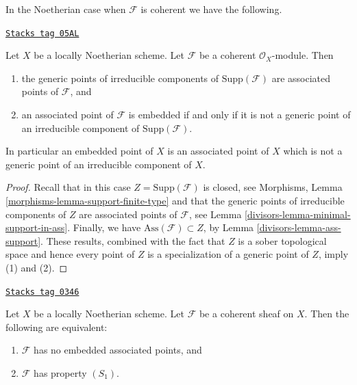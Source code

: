 In the Noetherian case when $\mathcal{F}$ is coherent we have
the following.

\begin{lemma}[Embedded]
\label{divisors-lemma-embedded}
\href{https://stacks.math.columbia.edu/tag/05AL}{\texttt{Stacks tag 05AL}}

Let $X$ be a locally Noetherian scheme.
Let $\mathcal{F}$ be a coherent $\mathcal{O}_X$-module.
Then
\begin{enumerate}
\item the generic points of irreducible components of
$\text{Supp}(\mathcal{F})$ are associated points of $\mathcal{F}$, and
\item an associated point of $\mathcal{F}$ is embedded if and only
if it is not a generic point of an irreducible component
of $\text{Supp}(\mathcal{F})$.
\end{enumerate}
In particular an embedded point of $X$ is an associated point of $X$
which is not a generic point of an irreducible component of $X$.
\end{lemma}

\begin{proof}

Recall that in this case $Z = \text{Supp}(\mathcal{F})$ is closed, see
Morphisms, Lemma \ref{morphisms-lemma-support-finite-type}
and that the generic points of irreducible components of $Z$ are
associated points of $\mathcal{F}$, see
Lemma \ref{divisors-lemma-minimal-support-in-ass}.
Finally, we have $\text{Ass}(\mathcal{F}) \subset Z$, by
Lemma \ref{divisors-lemma-ass-support}.
These results, combined with the fact that $Z$ is a sober topological
space and hence every point of $Z$ is a specialization of a generic
point of $Z$, imply (1) and (2).
\end{proof}

\begin{lemma}[S1 no embedded]
\label{divisors-lemma-S1-no-embedded}
\href{https://stacks.math.columbia.edu/tag/0346}{\texttt{Stacks tag 0346}}

Let $X$ be a locally Noetherian scheme.
Let $\mathcal{F}$ be a coherent sheaf on $X$.
Then the following are equivalent:
\begin{enumerate}
\item $\mathcal{F}$ has no embedded associated points, and
\item $\mathcal{F}$ has property $(S_1)$.
\end{enumerate}
\end{lemma}

